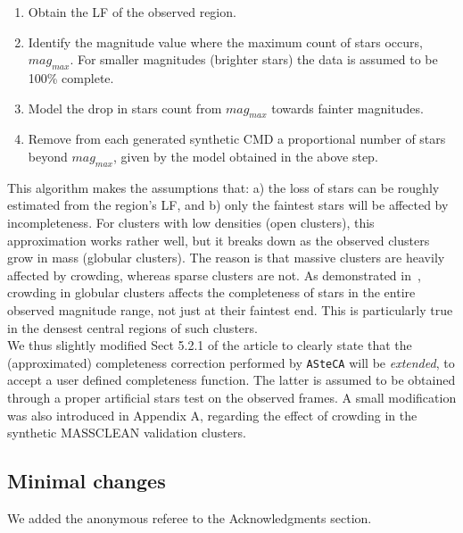 \documentclass{article}
\begin{document}
\begin{enumerate}
    \item Obtain the LF of the observed region.
    \item Identify the magnitude value where the maximum count of stars occurs,
    $mag_{max}$. For smaller magnitudes (brighter stars) the data is
    assumed to be 100\% complete.
    \item Model the drop in stars count from $mag_{max}$ towards fainter
    magnitudes.
    \item Remove from each generated synthetic CMD a proportional number of
    stars beyond $mag_{max}$, given by the model obtained in the above step.
\end{enumerate}

This algorithm makes the assumptions that: a) the loss of stars can be roughly
estimated from the region's LF, and b) only the faintest stars will be
affected by incompleteness. For clusters with low densities (open
clusters), this approximation works rather well, but it breaks down as the
observed clusters grow in mass (globular clusters). The reason is that massive
clusters are heavily affected by crowding, whereas sparse clusters are not.
%
As demonstrated in~\cite{Mateo_1988}, crowding in globular clusters affects the
completeness of stars in the entire observed magnitude range, not just at their
faintest end. This is particularly true in the densest central regions of such
clusters.\\

We thus slightly modified Sect 5.2.1 of the article to clearly state that the 
(approximated) completeness correction performed by \texttt{ASteCA} will be
\emph{extended}, to accept a user defined completeness function. The latter is
assumed to be obtained through a proper artificial stars test on the observed
frames.
A small modification was also introduced in Appendix A, regarding the effect of
crowding in the synthetic MASSCLEAN validation clusters.



\subsection{Minimal changes}
We added the anonymous referee to the Acknowledgments section.

\end{document}
